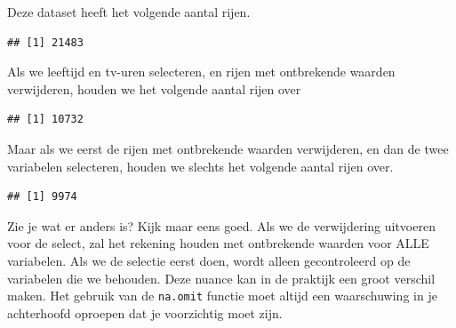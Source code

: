 \documentclass[]{tufte-book}
\newenvironment{Shaded}{}{}
\newcommand{\KeywordTok}[1]{\textcolor[rgb]{0.00,0.44,0.13}{\textbf{#1}}}
\newcommand{\NormalTok}[1]{#1}
\newcommand{\OperatorTok}[1]{\textcolor[rgb]{0.40,0.40,0.40}{#1}}
\newcommand{\StringTok}[1]{\textcolor[rgb]{0.25,0.44,0.63}{#1}}
\begin{document}
Deze dataset heeft het volgende aantal rijen.

\begin{Shaded}
\end{Shaded}

\begin{verbatim}
## [1] 21483
\end{verbatim}

Als we leeftijd en tv-uren selecteren, en rijen met ontbrekende waarden verwijderen, houden we het volgende aantal rijen over

\begin{Shaded}
\end{Shaded}

\begin{verbatim}
## [1] 10732
\end{verbatim}

Maar als we eerst de rijen met ontbrekende waarden verwijderen, en dan de twee variabelen selecteren, houden we slechts het volgende aantal rijen over.

\begin{Shaded}
\end{Shaded}

\begin{verbatim}
## [1] 9974
\end{verbatim}

Zie je wat er anders is? Kijk maar eens goed. Als we de verwijdering uitvoeren voor de select, zal het rekening houden met ontbrekende waarden voor ALLE variabelen. Als we de selectie eerst doen, wordt alleen gecontroleerd op de variabelen die we behouden. Deze nuance kan in de praktijk een groot verschil maken. Het gebruik van de \texttt{na.omit} functie moet altijd een waarschuwing in je achterhoofd oproepen dat je voorzichtig moet zijn.
\end{document}
